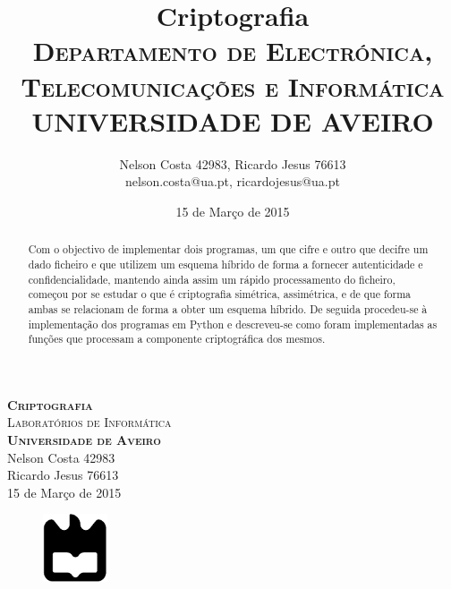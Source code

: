\documentclass[a4paper,11pt,openright,oneside]{report}
\begin{document}
\begin{titlepage}
\begin{center}

{\vspace*{50mm}\textsc{\Huge\textbf{Criptografia}\\ \small{Laboratórios de Informática}}}\\[2cm]
{\textsc{\small\textbf{Universidade de Aveiro}}}\\[0.5cm]
{\small Nelson Costa 42983\\Ricardo Jesus 76613}\\[0.5cm]
{\small	15 de Março de 2015}\\

\begin{figure}[b]
\center
\graphicspath{}
\includegraphics[height=2cm]{ua.pdf}
\end{figure}

\end{center}

\end{titlepage}

\title{\textbf{Criptografia}\\[1cm]\textsc{\small {Departamento de Electrónica, Telecomunicações e Informática} \\ \large {UNIVERSIDADE DE AVEIRO}}}
\author{Nelson Costa 42983, Ricardo Jesus 76613\\nelson.costa@ua.pt, ricardojesus@ua.pt}
\date{15 de Março de 2015}

\maketitle


\begin{abstract}

Com o objectivo de implementar dois programas, um que cifre e outro que decifre um dado ficheiro e que utilizem um esquema híbrido de forma a fornecer autenticidade e confidencialidade, mantendo ainda assim um rápido processamento do ficheiro, começou por se estudar o que é criptografia simétrica, assimétrica, e de que forma ambas se relacionam de forma a obter um esquema híbrido. De seguida procedeu-se à implementação dos programas em Python e descreveu-se como foram implementadas as funções que processam a componente criptográfica dos mesmos.

\end{abstract}
\end{document}
